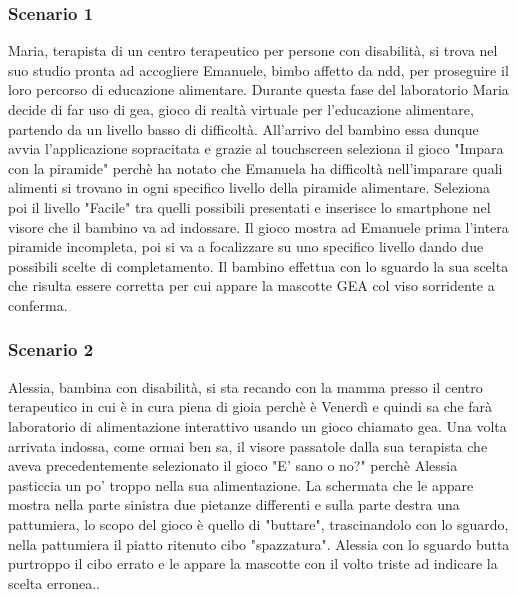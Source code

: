 \subsubsection{Scenario 1}
Maria, terapista di un centro terapeutico per persone con disabilità, si trova nel suo studio pronta ad accogliere Emanuele, bimbo affetto da \acs{ndd}, per proseguire il loro percorso di educazione alimentare. Durante questa fase del laboratorio Maria decide di far uso di \acs{gea}, gioco di realtà virtuale per l'educazione alimentare, partendo da un livello basso di difficoltà. All'arrivo del bambino essa dunque avvia l'applicazione sopracitata e grazie al touchscreen seleziona il gioco "Impara con la piramide" perchè ha notato che Emanuela ha difficoltà nell'imparare quali alimenti si trovano in ogni specifico livello della piramide alimentare. Seleziona poi il livello "Facile" tra quelli possibili presentati e inserisce lo smartphone nel visore che il bambino va ad indossare. Il gioco mostra ad Emanuele prima l'intera piramide incompleta, poi si va a focalizzare su uno specifico livello dando due possibili scelte di completamento. Il bambino effettua con lo sguardo la sua scelta che risulta essere corretta per cui appare la mascotte GEA col viso sorridente a conferma.
\subsubsection{Scenario 2}
Alessia, bambina con disabilità, si sta recando con la mamma presso il centro terapeutico in cui è in cura piena di gioia perchè è Venerdì e quindi sa che farà laboratorio di alimentazione interattivo usando un gioco chiamato \acs{gea}. Una volta arrivata indossa, come ormai ben sa, il visore passatole dalla sua terapista che aveva precedentemente selezionato il gioco "E' sano o no?" perchè Alessia pasticcia un po' troppo nella sua alimentazione. La schermata che le appare mostra nella parte sinistra due pietanze differenti e sulla parte destra una pattumiera, lo scopo del gioco è quello di "buttare", trascinandolo con lo sguardo, nella pattumiera il piatto ritenuto cibo "spazzatura". Alessia con lo sguardo butta purtroppo il cibo errato e le appare la mascotte con il volto triste ad indicare la scelta erronea..
\clearpage

